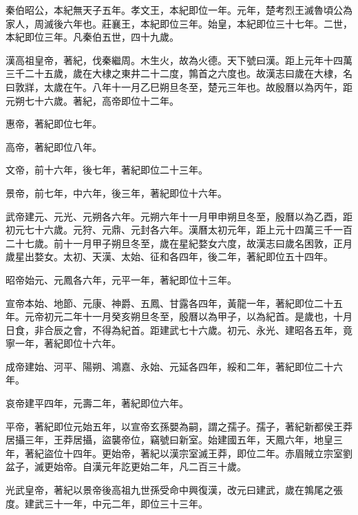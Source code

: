\begin{pinyinscope}
秦伯昭公，本紀無天子五年。孝文王，本紀即位一年。元年，楚考烈王滅魯頃公為家人，周滅後六年也。莊襄王，本紀即位三年。始皇，本紀即位三十七年。二世，本紀即位三年。凡秦伯五世，四十九歲。

漢高祖皇帝，著紀，伐秦繼周。木生火，故為火德。天下號曰漢。距上元年十四萬三千二十五歲，歲在大棣之東井二十二度，鶉首之六度也。故漢志曰歲在大棣，名曰敦牂，太歲在午。八年十一月乙巳朔旦冬至，楚元三年也。故殷曆以為丙午，距元朔七十六歲。著紀，高帝即位十二年。

惠帝，著紀即位七年。

高帝，著紀即位八年。

文帝，前十六年，後七年，著紀即位二十三年。

景帝，前七年，中六年，後三年，著紀即位十六年。

武帝建元、元光、元朔各六年。元朔六年十一月甲申朔旦冬至，殷曆以為乙酉，距初元七十六歲。元狩、元鼎、元封各六年。漢曆太初元年，距上元十四萬三千一百二十七歲。前十一月甲子朔旦冬至，歲在星紀婺女六度，故漢志曰歲名困敦，正月歲星出婺女。太初、天漢、太始、征和各四年，後二年，著紀即位五十四年。

昭帝始元、元鳳各六年，元平一年，著紀即位十三年。

宣帝本始、地節、元康、神爵、五鳳、甘露各四年，黃龍一年，著紀即位二十五年。元帝初元二年十一月癸亥朔旦冬至，殷曆以為甲子，以為紀首。是歲也，十月日食，非合辰之會，不得為紀首。距建武七十六歲。初元、永光、建昭各五年，竟寧一年，著紀即位十六年。

成帝建始、河平、陽朔、鴻嘉、永始、元延各四年，綏和二年，著紀即位二十六年。

哀帝建平四年，元壽二年，著紀即位六年。

平帝，著紀即位元始五年，以宣帝玄孫嬰為嗣，謂之孺子。孺子，著紀新都侯王莽居攝三年，王莽居攝，盜襲帝位，竊號曰新室。始建國五年，天鳳六年，地皇三年，著紀盜位十四年。更始帝，著紀以漢宗室滅王莽，即位二年。赤眉賊立宗室劉盆子，滅更始帝。自漢元年訖更始二年，凡二百三十歲。

光武皇帝，著紀以景帝後高祖九世孫受命中興復漢，改元曰建武，歲在鶉尾之張度。建武三十一年，中元二年，即位三十三年。


\end{pinyinscope}